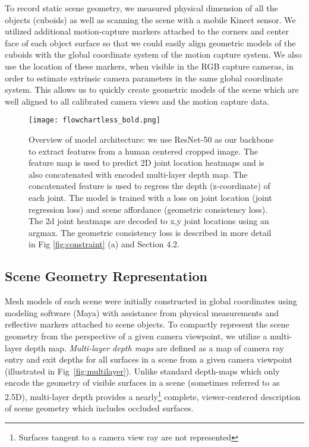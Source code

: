 \documentclass[times,referee,twocolumn,final,authoryear]{elsarticle}
\begin{document}
To record static scene geometry, we measured physical dimension of all the objects
(cuboids) as well as scanning the scene with a mobile Kinect sensor.  We utilized 
additional motion-capture markers attached to the corners and center face of each 
object surface so that we could easily align geometric models of the cuboids with the 
global coordinate system of the motion capture system. We also use the location of 
these markers, when visible in the RGB capture cameras, in order to estimate
extrinsic camera parameters in the same global coordinate system.  This allows
us to quickly create geometric models of the scene which are well aligned to
all calibrated camera views and the motion capture data.

\begin{figure*}
\begin{center}
  
   \texttt{[image: flowchartless\_bold.png]}
\end{center}
   \caption{Overview of model architecture: we use ResNet-50 as our backbone to
   extract features from a human centered cropped image.  The feature map is
   used to predict 2D joint location heatmaps and is also concatenated with
   encoded multi-layer depth map. The concatenated feature is used to regress
   the depth (z-coordinate) of each joint. The model is trained with a loss
   on joint location (joint regression loss) and scene affordance (geometric
   consistency loss). The 2d joint heatmaps are decoded to x,y joint locations 
   using an argmax. The geometric consistency loss is described in more detail in
   Fig \ref{fig:constraint} (a) and Section 4.2.} 
\label{fig:method}
\end{figure*}

\subsection{Scene Geometry Representation}
Mesh models of each scene were initially constructed in global coordinates using
modeling software (Maya) with assistance from physical measurements and reflective 
markers attached to scene objects. To compactly represent the scene geometry from the 
perspective of a given camera viewpoint, we utilize a multi-layer depth map.
{\em Multi-layer depth maps} are defined as a map of camera ray entry and exit depths for all 
surfaces in a scene from a given camera viewpoint (illustrated in Fig~\ref{fig:multilayer}).
Unlike standard depth-maps which only encode the geometry of visible surfaces in a scene 
(sometimes referred to as 2.5D), multi-layer depth provides a nearly\footnote{Surfaces 
tangent to a camera view ray are not represented} complete, viewer-centered description of 
scene geometry which includes occluded surfaces.
\end{document}

